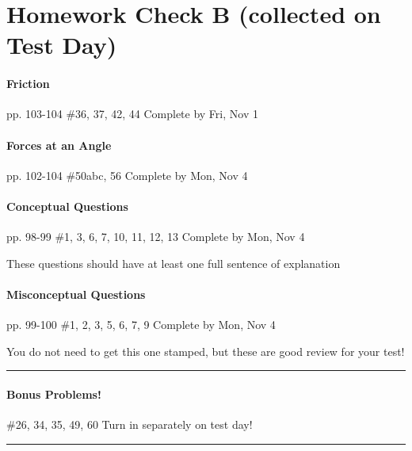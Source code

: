 \documentclass[10pt]{exam}
\begin{document}
\section*{Homework Check B (collected on Test Day)}

\paragraph{Friction} pp. 103-104 \#36, 37, 42, 44
\dotfill Complete by Fri, Nov 1




\paragraph{Forces at an Angle} pp. 102-104 \#50abc, 56%
\dotfill Complete by Mon, Nov 4
   


\paragraph{Conceptual Questions} pp. 98-99 \#1, 3, 6, 7, 10, 11, 12, 13
\dotfill Complete by Mon, Nov 4
   
{\sc These questions should have at least one full sentence 
      of explanation}



\paragraph{Misconceptual Questions} pp. 99-100 \#1, 2, 3, 5, 6, 7, 9
\dotfill Complete by Mon, Nov 4
   
{\sc You do not need to get this one stamped,
but these are good review for your test!}

\vspace{1em}
\hrule


\paragraph{Bonus Problems!} \#26, 34, 35, 49, 60
\dotfill Turn in separately on test day!

\vspace{1em}
\hrule


\end{document}
